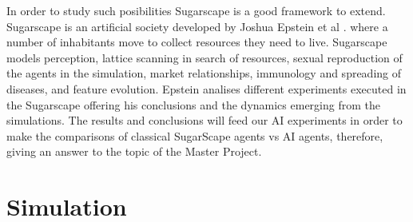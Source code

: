 \documentclass[11pt,oneside,a4paper,openright]{report}
\begin{document}
In order to study such posibilities Sugarscape is a good framework to extend. Sugarscape is an artificial society developed by Joshua Epstein et al \cite{EpsteinAxtell}. where a number of inhabitants move to collect resources they need to live. Sugarscape models perception, lattice scanning in search of resources, sexual reproduction of the agents in the simulation, market relationships, immunology and spreading of diseases, and feature evolution. Epstein analises different experiments executed in the Sugarscape offering his conclusions and the dynamics emerging from the simulations. The results and conclusions will feed our AI experiments in order to make the comparisons of classical SugarScape agents vs AI agents, therefore, giving an answer to the topic of the Master Project.\\

\section{Simulation}
\end{document}
